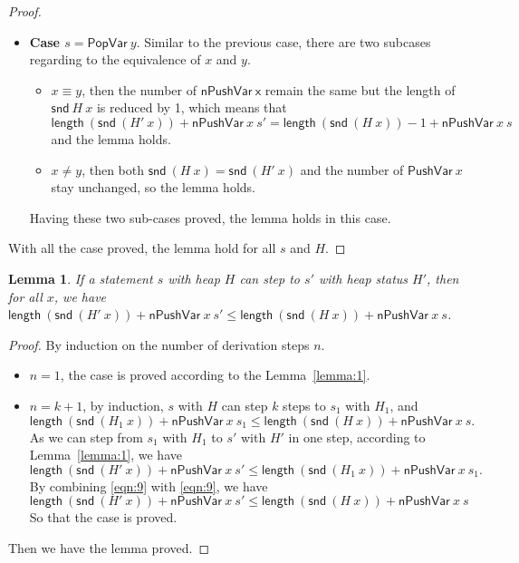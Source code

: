 \documentclass[letter, notitlepage]{article}
\newtheorem{lemma}{Lemma}
\begin{document}
\begin{proof}
\begin{itemize}
			Thus in the case the lemma holds.
		\item \textbf{Case $s=\mathsf{PopVar}~y$}. Similar to the previous case, there are two subcases regarding to the equivalence of $x$ and $y$. 
			\begin{itemize}
			\item $x\equiv y$, then the number of $\mathsf{nPushVar~x}$ remain the same but the length of $\mathsf{snd}~H~x$ is reduced by 1, which means that 
			$$\mathsf{length}~(\mathsf{snd}~(H'~x)) + \mathsf{nPushVar}~x~s' = \mathsf{length}~(\mathsf{snd}~(H~x)) - 1 + \mathsf{nPushVar}~x~s$$
			and the lemma holds.
			\item $x\neq y$, then both $\mathsf{snd}~(H~x)=\mathsf{snd}~(H'~x)$ and the number of $\mathsf{PushVar}~x$ stay unchanged, so the lemma holds.
			\end{itemize}
		Having these two sub-cases proved, the lemma holds in this case.
	\end{itemize}
	With all the case proved, the lemma hold for all $s$ and $H$.
\end{proof}

\begin{lemma}\label{lemma:2}
	If a statement $s$ with heap $H$ can step to $s'$ with heap status $H'$, then for all $x$, we have $\mathsf{length}~(\mathsf{snd}~(H'~x)) + \mathsf{nPushVar}~x~s' \leq \mathsf{length}~(\mathsf{snd}~(H~x)) + \mathsf{nPushVar}~x~s$.
\end{lemma}
\begin{proof}
	By induction on the number of derivation steps $n$.
	\begin{itemize}
	\item $n=1$, the case is proved according to the Lemma~\ref{lemma:1}.
	\item $n=k+1$, by induction, $s$ with $H$ can step $k$ steps to $s_1$ with $H_1$, and 
		\begin{equation}\label{eqn:9}
			\mathsf{length}~(\mathsf{snd}~(H_1~x)) + \mathsf{nPushVar}~x~s_1 \leq \mathsf{length}~(\mathsf{snd}~(H~x)) + \mathsf{nPushVar}~x~s.
		\end{equation}
		As we can step from $s_1$ with $H_1$ to $s'$ with $H'$ in one step, according to Lemma~\ref{lemma:1}, we have
		\begin{equation}\label{eqn:10}
			\mathsf{length}~(\mathsf{snd}~(H'~x)) + \mathsf{nPushVar}~x~s' \leq \mathsf{length}~(\mathsf{snd}~(H_1~x)) + \mathsf{nPushVar}~x~s_1.
		\end{equation}
		By combining \ref{eqn:9} with \ref{eqn:9}, we have 
		\begin{equation}
			\mathsf{length}~(\mathsf{snd}~(H'~x)) + \mathsf{nPushVar}~x~s' \leq \mathsf{length}~(\mathsf{snd}~(H~x)) + \mathsf{nPushVar}~x~s
		\end{equation}
		So that the case is proved.
	\end{itemize}
	Then we have the lemma proved.
\end{proof}
\end{document}
